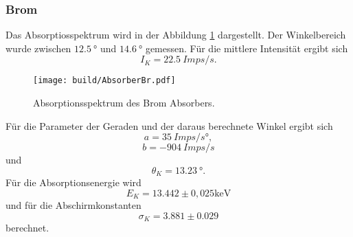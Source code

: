 \subsubsection{Brom}
Das Absorptiosspektrum wird in der Abbildung \ref{fig:AbBr} dargestellt.
Der Winkelbereich wurde zwischen $\qty{12.5}{°}$ und $\qty{14.6}{°}$ gemessen.
Für die mittlere Intensität ergibt sich 
\begin{equation*}
    I_K = \qty{22.5}{Imps/s}.
\end{equation*}

\begin{figure}[H]
    \centering
    \texttt{[image: build/AbsorberBr.pdf]}
    \caption{Absorptionsspektrum des Brom Absorbers.}
    \label{fig:AbBr}
\end{figure}
\noindent Für die Parameter der Geraden und der daraus berechnete Winkel ergibt sich 
\begin{equation*}
    a = \qty{35}{Imps/s°},
\end{equation*}
\begin{equation*}
    b = \qty{-904}{Imps/s}
\end{equation*}
und
\begin{equation*}
    \theta_K = \qty{13.23}{°}.
\end{equation*}
Für die Absorptionsenergie wird 
\begin{equation*}
    E_K = 13.442 \pm 0,025 \unit{\kilo\electronvolt}
\end{equation*}
und für die Abschirmkonstanten
\begin{equation*}
     \sigma_K = 3.881 \pm 0.029
\end{equation*}
berechnet.

